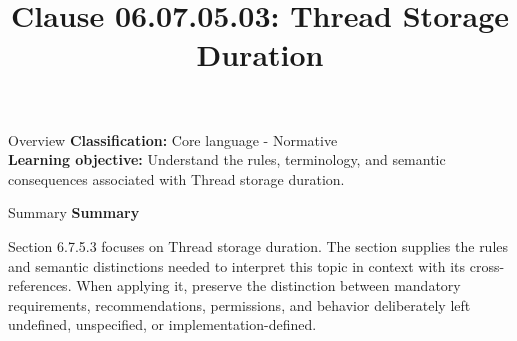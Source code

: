 \documentclass[10pt,letterpaper]{article}
\title{Clause 06.07.05.03: Thread Storage Duration}
\author{}
\date{}
\begin{document}
\maketitle
\begin{CornellOverviewBox}{Overview}
\textbf{Classification:} Core language - Normative\\[2pt]
\textbf{Learning objective:} Understand the rules, terminology, and semantic consequences associated with Thread storage duration.
\end{CornellOverviewBox}\begin{CornellSummaryBox}{Summary}
{\sffamily\bfseries\color{Accent} Summary}\par\vspace{3pt}Section 6.7.5.3 focuses on Thread storage duration. The section supplies the rules and semantic distinctions needed to interpret this topic in context with its cross-references. When applying it, preserve the distinction between mandatory requirements, recommendations, permissions, and behavior deliberately left undefined, unspecified, or implementation-defined.
\end{CornellSummaryBox}
\end{document}
